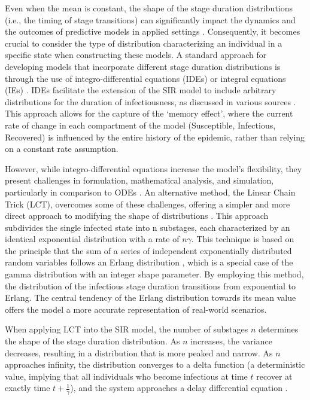 \documentclass[12pt]{article}
\begin{document}
Even when the mean is constant, the shape of the stage duration distributions (i.e., the timing of stage transitions) can significantly impact the dynamics and the outcomes of predictive models in applied settings \cite{krylova2013effects}\cite{keeling2002understanding}\cite{wearing2005appropriate}\cite{nguyen2008noise}. Consequently, it becomes crucial to consider the type of distribution characterizing an individual in a specific state when constructing these models. A standard approach for developing models that incorporate different stage duration distributions is through the use of integro-differential equations (IDEs) or integral equations (IEs) \cite{hurtado2019generalizations}\cite{kermack1927contribution}\cite{hethcote1980integral}. IDEs facilitate the extension of the SIR model to include arbitrary distributions for the duration of infectiousness, as discussed in various sources \cite{feng2000endemic}\cite{hethcote1980integral}\cite{ma2006generality}. This approach allows for the capture of the `memory effect', where the current rate of change in each compartment of the model (Susceptible, Infectious, Recovered) is influenced by the entire history of the epidemic, rather than relying on a constant rate assumption.

However, while integro-differential equations increase the model's flexibility, they present challenges in formulation, mathematical analysis, and simulation, particularly in comparison to ODEs \cite{krylova2013effects}\cite{hurtado2019generalizations}\cite{burton2005volterra}. An alternative method, the Linear Chain Trick (LCT), overcomes some of these challenges, offering a simpler and more direct approach to modifying the shape of distributions \cite{macdonald1978time}\cite{smith2011introduction}. This approach subdivides the single infected state into n substages, each characterized by an identical exponential distribution with a rate of $n\gamma$. This technique is based on the principle that the sum of a series of independent exponentially distributed random variables follows an Erlang distribution \cite{krylova2013effects}\cite{therrien2018probability}, which is a special case of the gamma distribution with an integer shape parameter. By employing this method, the distribution of the infectious stage duration transitions from exponential to Erlang. The central tendency of the Erlang distribution towards its mean value offers the model a more accurate representation of real-world scenarios.

When applying LCT into the SIR model, the number of substages $n$ determines the shape of the stage duration distribution. As $n$ increases, the variance decreases, resulting in a distribution that is more peaked and narrow. As $n$ approaches infinity, the distribution converges to a delta function (a deterministic value, implying that all individuals who become infectious at time $t$ recover at exactly time $t + \frac{1}{\gamma}$), and the system approaches a delay differential equation \cite{krylova2013effects}\cite{hethcote1980integral}.
\end{document}
